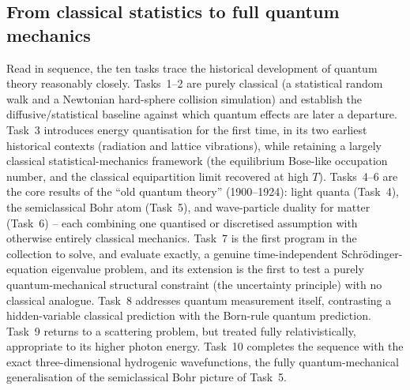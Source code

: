 \documentclass[11pt]{article}
\begin{document}
\subsection{From classical statistics to full quantum mechanics}
Read in sequence, the ten tasks trace the historical development of quantum theory reasonably closely. Tasks~1--2 are purely classical (a statistical random walk and a Newtonian hard-sphere collision simulation) and establish the diffusive/statistical baseline against which quantum effects are later a departure. Task~3 introduces energy quantisation for the first time, in its two earliest historical contexts (radiation and lattice vibrations), while retaining a largely classical statistical-mechanics framework (the equilibrium Bose-like occupation number, and the classical equipartition limit recovered at high $T$). Tasks~4--6 are the core results of the ``old quantum theory'' (1900--1924): light quanta (Task~4), the semiclassical Bohr atom (Task~5), and wave-particle duality for matter (Task~6) -- each combining one quantised or discretised assumption with otherwise entirely classical mechanics. Task~7 is the first program in the collection to solve, and evaluate exactly, a genuine time-independent Schr\"odinger-equation eigenvalue problem, and its extension is the first to test a purely quantum-mechanical structural constraint (the uncertainty principle) with no classical analogue. Task~8 addresses quantum measurement itself, contrasting a hidden-variable classical prediction with the Born-rule quantum prediction. Task~9 returns to a scattering problem, but treated fully relativistically, appropriate to its higher photon energy. Task~10 completes the sequence with the exact three-dimensional hydrogenic wavefunctions, the fully quantum-mechanical generalisation of the semiclassical Bohr picture of Task~5.
\end{document}
